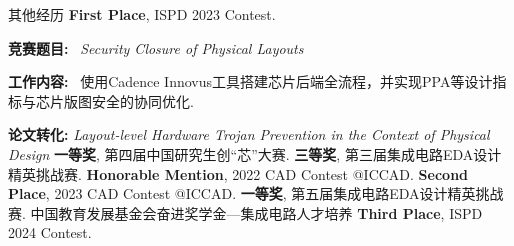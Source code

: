 \begin{rubric}{其他经历}
	\entry*[2023] \textbf{First Place}, ISPD 2023 Contest.
	\par \textbf{竞赛题目:} ~\emph{Security Closure of Physical Layouts}
	\par \textbf{工作内容:} ~使用Cadence Innovus工具搭建芯片后端全流程，并实现PPA等设计指标与芯片版图安全的协同优化.
	\par \textbf{论文转化:} \emph{Layout-level Hardware Trojan Prevention in the Context of Physical Design} \cite{tong2024layout}
	\entry*[2021] \textbf{一等奖}, 第四届中国研究生创“芯”大赛.
	\entry*[2021] \textbf{三等奖}, 第三届集成电路EDA设计精英挑战赛.
	\entry*[2022] \textbf{Honorable Mention}, 2022 CAD Contest @ICCAD.
	\entry*[2023] \textbf{Second Place}, 2023 CAD Contest @ICCAD.
	\entry*[2023] \textbf{一等奖}, 第五届集成电路EDA设计精英挑战赛.
	\entry*[2023] 中国教育发展基金会奋进奖学金—集成电路人才培养
	\entry*[2024] \textbf{Third Place}, ISPD 2024 Contest.

\end{rubric}
